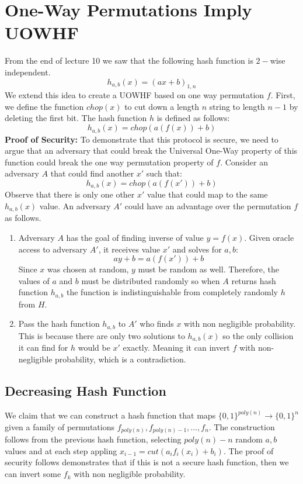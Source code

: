 \documentclass[11pt]{article}
\begin{document}
\section{One-Way Permutations Imply UOWHF}
From the end of lecture 10 we saw that the following hash function is $2-$wise independent.
$$h_{a,b}(x) = (ax+b)_{1,n}$$
We extend this idea to create a UOWHF based on one way permutation $f$. First, we define the function $chop(x)$ to cut down a length $n$ string to length $n-1$ by deleting the first bit. The hash function $h$ is defined as follows:
$$h_{a,b}(x) = chop(a(f(x))+b)$$
\textbf{Proof of Security:} To demonstrate that this protocol is secure, we need to argue that an adversary that could break the Universal One-Way property of this function could break the one way permutation property of $f$. Consider an adversary $A$ that could find another $x'$ such that:
$$h_{a,b}(x) = chop(a(f(x'))+b)$$
Observe that there is only one other $x'$ value that could map to the same $h_{a,b}(x)$ value. An adversary $A'$ could have an advantage over the permutation $f$ as follows.
\begin{enumerate}
    \item Adversary $A$ has the goal of finding inverse of value $y=f(x)$. Given oracle access to adversary $A'$, it receives value $x'$ and solves for $a,b$:
    $$ay + b = a(f(x')) + b$$
    Since $x$ was chosen at random, $y$ must be random as well. Therefore, the values of $a$ and $b$ must be distributed randomly so when $A$ returns hash function $h_{a,b}$ the function is indistinguishable from completely randomly $h$ from $H$.
    \item Pass the hash function $h_{a,b}$ to $A'$ who finds $x$ with non negligible probability. This is because there are only two solutions to $h_{a,b}(x)$ so the only collision it can find for $h$ would be $x'$ exactly. Meaning it can invert $f$ with non-negligible probability, which is a contradiction.
\end{enumerate} 

\subsection{Decreasing Hash Function}
We claim that we can construct a hash function that maps $\{0,1\}^{poly(n)} \rightarrow \{0,1\}^n$ given a family of permutations $f_{poly(n)}, f_{poly(n)-1},..., f_{n}$. The construction follows from the previous hash function, selecting $poly(n)-n$ random $a,b$ values and at each step appling $x_{i-1} = cut(a_if_i(x_i)+b_i)$. The proof of security follows demonstrates that if this is not a secure hash function, then we can invert some $f_k$ with non negligible probability.
\vspace{1em}
\end{document}
